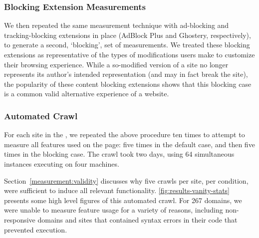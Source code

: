 \subsubsection{Blocking Extension Measurements}
\label{measurement:methodology:blocking-case-measurements} We then repeated the
same measurement technique with ad-blocking and tracking-blocking extensions in
place (AdBlock Plus and Ghostery, respectively), to generate a second,
`blocking', set of measurements. We treated these blocking extensions as
representative of the types of modifications users make to customize their
browsing experience. While a so-modified version of a site no longer represents
its author's intended representation (and may in fact break the site), the
popularity of these content blocking extensions shows that this blocking case
is a common valid alternative experience of a website.


\subsubsection{Automated Crawl}
\label{measurement:methodology:automated-crawl}

For each site in the \ATK, we repeated the above procedure ten times to
attempt to measure all features used on the page: five times in the default
case, and then five times in the blocking case.  The crawl took two days, using
64 simultaneous \FF instances executing on four machines.

Section~\ref{measurement:validity} discusses why five crawls per site, per
condition, were sufficient to induce all relevant functionality.
\ref{fig:results-vanity-stats} presents some high level figures of this
automated crawl.  For 267 domains, we were unable to measure feature usage for
a variety of reasons, including non-responsive domains and sites that contained
syntax errors in their \JS code that prevented execution.
